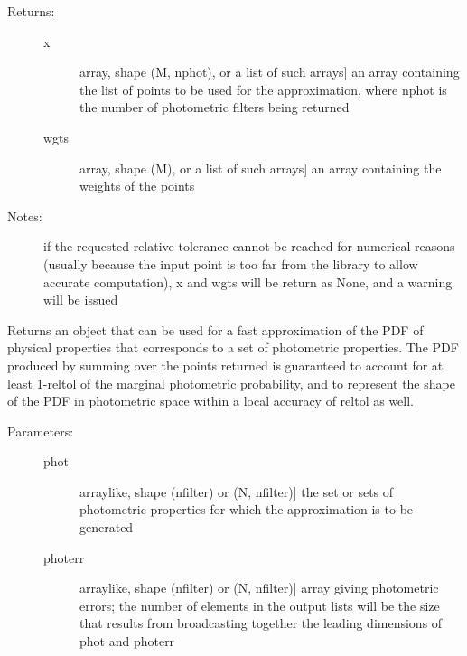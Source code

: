 \documentclass[letterpaper,10pt,english]{sphinxmanual}
\begin{document}
\begin{fulllineitems}
\begin{fulllineitems}
\begin{description}
\begin{description}
\end{description}

\item[{Returns:}] \leavevmode\begin{description}
\item[{x}] \leavevmode{[}array, shape (M, nphot), or a list of such arrays{]}
an array containing the list of points to be used for
the approximation, where nphot is the number of
photometric filters being returned

\item[{wgts}] \leavevmode{[}array, shape (M), or a list of such arrays{]}
an array containing the weights of the points

\end{description}

\item[{Notes:}] \leavevmode
if the requested relative tolerance cannot be reached for
numerical reasons (usually because the input point is too
far from the library to allow accurate computation), x and
wgts will be return as None, and a warning will be issued

\end{description}

\end{fulllineitems}


\begin{fulllineitems}
\label{\detokenize{bayesphot:slugpy.bayesphot.bp.bp.make_approx_phys}}
Returns an object that can be used for a fast approximation of
the PDF of physical properties that corresponds to a set of
photometric properties. The PDF produced by summing over the
points returned is guaranteed to account for at least 1-reltol
of the marginal photometric probability, and to represent the
shape of the PDF in photometric space within a local accuracy
of reltol as well.
\begin{description}
\item[{Parameters:}] \leavevmode\begin{description}
\item[{phot}] \leavevmode{[}arraylike, shape (nfilter) or (N, nfilter){]}
the set or sets of photometric properties for which the
approximation is to be generated

\item[{photerr}] \leavevmode{[}arraylike, shape (nfilter) or (N, nfilter){]}
array giving photometric errors; the number of elements
in the output lists will be the size that results from
broadcasting together the leading dimensions of phot and
photerr


\end{description}
\end{description}
\end{fulllineitems}
\end{fulllineitems}
\end{document}
